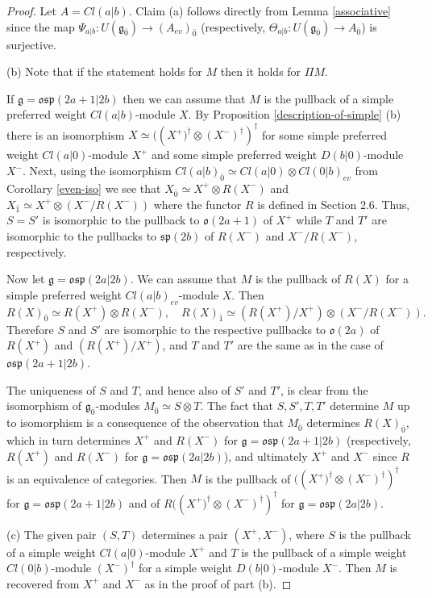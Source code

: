 \documentclass[12pt]{amsart}
\makeatletter
\def\@putname#1#2#3#4{\def\@@ref{#3}\let\old@bf\bf
        \def\bf##1{\old@bf\if?\noexpand##1?{#4}\else##1\fi}%
	#1{#2}%
        \let\bf\old@bf}
\def\@putname#1#2#3#4{\def\@@ref{#3}\let\old@bf\bf	%
	\let\old@reset@font\reset@font			%
        \def\bf##1{\old@bf\if?\noexpand##1?{#4}\else##1\fi}%
	\def\reset@font##1##2{\old@reset@font##1\if?\noexpand##2?{#4}\else##2\fi}#1{#2}%
        \let\bf\old@bf\let\reset@font\old@reset@font}
\let\my@ref=\ref
\def\ref#1{\@putname\my@ref{#1}{#1}{\tiny\rm\@@ref}}
\theoremstyle{plain} %
\numberwithin{equation}{section}
\theoremstyle{definition}
\theoremstyle{remark}
\theoremstyle{plain} %
\renewcommand{\gg}{\mathfrak{g}}
\renewcommand{\sp}{\mathfrak{sp}}
\newcommand{\so}{\mathfrak{o}}
\def\gg{\mathfrak{g}}
\makeatother
\begin{document}
	 \begin{proof} Let $A=Cl(a|b)$.
          Claim (a) follows directly from Lemma \ref{associative} since the map  $\Psi_{a|b}:U(\gg_{\bar 0})\to (A_{ev})_{\bar 0}$ (respectively, $\Theta_{a|b}:U(\gg_{\bar 0})\to A_{\bar 0}$)  is surjective.
	 
         (b) Note that if the statement holds for $M$ then it holds for $\Pi M$.
         
             If $\gg=\mathfrak{osp}(2a+1|2b)$ then we can assume that $M$ is the pullback of a simple preferred weight $Cl(a|b)$-module $X$. By Proposition \ref{description-of-simple}(b) there is an isomorphism  $X\simeq (\left(X^+)^\dagger\otimes (X^-)^\dagger \right)^{\dagger}$  for some simple preferred weight $Cl(a|0)$-module $X^+$ and some
             simple preferred weight $D(b|0)$-module $X^-$. Next, using the isomorphism $Cl(a|b)_{\bar 0} \simeq Cl(a|0)\otimes Cl(0|b)_{ev}$ from Corollary \ref{even-iso}
             we see that
             $X_{\bar 0}\simeq X^+\otimes R(X^-)$ and $X_{\bar 1} \simeq X^+\otimes (X^-/R(X^-))$ where the functor $R$ is defined in Section 2.6.  Thus, $S = S'$ is isomorphic to the pullback to $\so (2a+1)$  of $X^+$ while $T$ and $T'$ are isomorphic to the pullbacks  to $\sp (2b)$ of
             $R(X^-)$ and $X^-/R(X^-)$,
           respectively. 

            Now let $\gg=\mathfrak{osp}(2a|2b)$. We can assume that  $M$ is the pullback of $R(X)$ for a simple preferred weight
            $Cl(a|b)_{ev}$-module $X$. Then
            $$R(X)_{\bar 0}\simeq R(X^+)\otimes  R(X^-),\quad R(X)_{\bar 1}\simeq  (R(X^+)/X^+)\otimes (X^-/R(X^-)).$$
            Therefore $S$ and $S'$ are isomorphic to the respective pullbacks to $\so (2a)$ of $R(X^+)$ and $(R(X^+)/X^+)$, and  $T$ and $T'$ are the same as in the case of $\mathfrak{osp}(2a+1|2b)$. 
            
    The uniqueness of $S$ and $T$, and hence also of $S'$ and $T'$, is clear from the isomorphism of $\mathfrak g_{\bar{0}}$-modules $ M_{\bar{0}}\simeq S\otimes T$. The fact that   $S,S',T,T'$ determine $M$ up to isomorphism is a consequence of the observation that $M_{\bar{0}}$ determines $R(X)_{\bar{0}}$, which in turn determines $X^+$ and $R(X^-)$ for $\gg=\mathfrak{osp}(2a+1|2b)$ (respectively, $R(X^+)$ and $R(X^-)$ for $\gg=\mathfrak{osp}(2a|2b)$),  and ultimately $X^+$ and $X^-$ since $R$ is an equivalence of categories. Then $M$ is the pullback of $(\left(X^+)^\dagger\otimes (X^-)^\dagger \right)^{\dagger}$  for $\gg=\mathfrak{osp}(2a+1|2b)$ and of $R(\left(X^+)^\dagger\otimes (X^-)^\dagger \right)^{\dagger}$  for $\gg=\mathfrak{osp}(2a|2b)$.

            (c) The given  pair $(S,T)$ determines a pair $(X^+, X^-)$, where $S$ is the pullback of a simple weight $Cl(a|0)$-module $X^+$ and $T$ is the pullback of a simple weight  $Cl(0|b)$-module  $(X^-)^\dagger$ for a simple weight  $D(b|0)$-module $X^{-}$. Then $M$ is recovered from $X^+$ and $X^-$ as in the proof of part (b).
	 \end{proof}
	 
\end{document}
